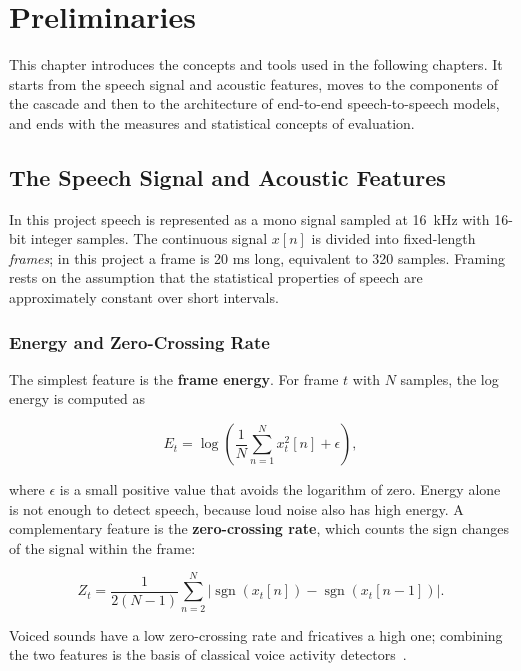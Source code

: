 \chapter{Preliminaries}
\label{ch:prelim}

This chapter introduces the concepts and tools used in the following chapters.
It starts from the speech signal and acoustic features, moves to the components
of the cascade and then to the architecture of end-to-end speech-to-speech
models, and ends with the measures and statistical concepts of evaluation.

\section{The Speech Signal and Acoustic Features}
\label{sec:features}

In this project speech is represented as a mono signal sampled at 16~kHz with
16-bit integer samples. The continuous signal $x[n]$ is divided into fixed-length
\emph{frames}; in this project a frame is 20 ms long, equivalent to 320 samples.
Framing rests on the assumption that the statistical properties of speech are
approximately constant over short intervals.

\subsection{Energy and Zero-Crossing Rate}

The simplest feature is the \textbf{frame energy}. For frame $t$ with $N$
samples, the log energy is computed as

\begin{equation}
E_t = \log\!\left(\frac{1}{N}\sum_{n=1}^{N} x_t^2[n] + \epsilon\right),
\label{eq:energy}
\end{equation}

where $\epsilon$ is a small positive value that avoids the logarithm of zero.
Energy alone is not enough to detect speech, because loud noise also has high
energy. A complementary feature is the \textbf{zero-crossing rate}, which counts
the sign changes of the signal within the frame:

\begin{equation}
Z_t = \frac{1}{2(N-1)}\sum_{n=2}^{N}
      \bigl|\operatorname{sgn}(x_t[n]) - \operatorname{sgn}(x_t[n-1])\bigr|.
\label{eq:zcr}
\end{equation}

Voiced sounds have a low zero-crossing rate and fricatives a high one; combining
the two features is the basis of classical voice activity
detectors~\cite{sohn1999vad}.


